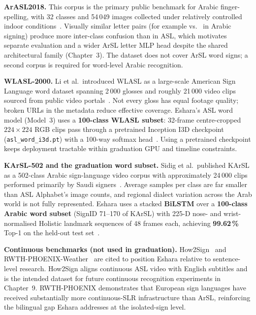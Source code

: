 \noindent\textbf{ArASL2018.} This corpus is the primary public benchmark for Arabic finger-spelling, with 32 classes and 54\,049 images collected under relatively controlled indoor conditions~\cite{arthur2018arasl2018}. Visually similar letter pairs (for example  vs.\  in Arabic signing) produce more inter-class confusion than in ASL, which motivates separate evaluation and a wider ArSL letter MLP head despite the shared architectural family (Chapter~3). The dataset does not cover ArSL word signs; a second corpus is required for word-level Arabic recognition.\par\vspace{0.2cm}

\noindent\textbf{WLASL-2000.} Li et al.\ introduced WLASL as a large-scale American Sign Language word dataset spanning 2\,000 glosses and roughly 21\,000 video clips sourced from public video portals~\cite{li2020wlasl}. Not every gloss has equal footage quality; broken URLs in the metadata reduce effective coverage. Eshara's ASL word model (Model~3) uses a \textbf{100-class WLASL subset}: 32-frame centre-cropped $224\!\times\!224$ RGB clips pass through a pretrained Inception I3D checkpoint (\texttt{asl\_word\_i3d.pt}) with a 100-way softmax head~\cite{li2020wlasl}. Using a pretrained checkpoint keeps deployment tractable within graduation GPU and timeline constraints.\par\vspace{0.2cm}

\noindent\textbf{KArSL-502 and the graduation word subset.} Sidig et al.\ published KArSL as a 502-class Arabic sign-language video corpus with approximately 24\,000 clips performed primarily by Saudi signers~\cite{sidig2021karsl}. Average samples per class are far smaller than ASL Alphabet's image counts, and regional dialect variation across the Arab world is not fully represented. Eshara uses a stacked \textbf{BiLSTM} over a \textbf{100-class Arabic word subset} (SignID 71--170 of KArSL) with 225-D nose- and wrist-normalised Holistic landmark sequences of 48 frames each, achieving \textbf{99.62\,\%} Top-1 on the held-out test set~\cite{sidig2021karsl}.\par\vspace{0.2cm}

\noindent\textbf{Continuous benchmarks (not used in graduation).} How2Sign~\cite{duarte2021how2sign} and RWTH-PHOENIX-Weather~\cite{forster2014rwth} are cited to position Eshara relative to sentence-level research. How2Sign aligns continuous ASL video with English subtitles and is the intended dataset for future continuous recognition experiments in Chapter~9. RWTH-PHOENIX demonstrates that European sign languages have received substantially more continuous-SLR infrastructure than ArSL, reinforcing the bilingual gap Eshara addresses at the isolated-sign level.\par\vspace{0.3cm}

